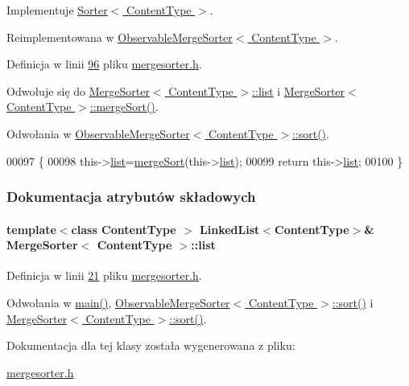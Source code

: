 Implementuje \hyperlink{class_sorter_a880cfd8969b78557ed207ad6f2bd4819}{Sorter$<$ Content\-Type $>$}.



Reimplementowana w \hyperlink{class_observable_merge_sorter_adc1960b58289c829ca9c77b7b6bc306f}{Observable\-Merge\-Sorter$<$ Content\-Type $>$}.



Definicja w linii \hyperlink{mergesorter_8h_source_l00096}{96} pliku \hyperlink{mergesorter_8h_source}{mergesorter.\-h}.



Odwołuje się do \hyperlink{mergesorter_8h_source_l00021}{Merge\-Sorter$<$ Content\-Type $>$\-::list} i \hyperlink{mergesorter_8h_source_l00074}{Merge\-Sorter$<$ Content\-Type $>$\-::merge\-Sort()}.



Odwołania w \hyperlink{observablemergesorter_8h_source_l00026}{Observable\-Merge\-Sorter$<$ Content\-Type $>$\-::sort()}.


\begin{DoxyCode}
00097         \{
00098                 this->\hyperlink{class_merge_sorter_a2fdeadd95d226a04243bab8b5104e324}{list}=\hyperlink{class_merge_sorter_a18cea501ccb017ea6a725698254ccd3f}{mergeSort}(this->\hyperlink{class_merge_sorter_a2fdeadd95d226a04243bab8b5104e324}{list});
00099                 \textcolor{keywordflow}{return} this->\hyperlink{class_merge_sorter_a2fdeadd95d226a04243bab8b5104e324}{list};
00100         \}
\end{DoxyCode}


\subsubsection{Dokumentacja atrybutów składowych}
\hypertarget{class_merge_sorter_a2fdeadd95d226a04243bab8b5104e324}{
\paragraph[{list}]{\setlength{\rightskip}{0pt plus 5cm}template$<$class Content\-Type $>$ {\bf Linked\-List}$<$Content\-Type$>$\& {\bf Merge\-Sorter}$<$ Content\-Type $>$\-::list}}\label{class_merge_sorter_a2fdeadd95d226a04243bab8b5104e324}


Definicja w linii \hyperlink{mergesorter_8h_source_l00021}{21} pliku \hyperlink{mergesorter_8h_source}{mergesorter.\-h}.



Odwołania w \hyperlink{main_8cpp_source_l00022}{main()}, \hyperlink{observablemergesorter_8h_source_l00026}{Observable\-Merge\-Sorter$<$ Content\-Type $>$\-::sort()} i \hyperlink{mergesorter_8h_source_l00096}{Merge\-Sorter$<$ Content\-Type $>$\-::sort()}.



Dokumentacja dla tej klasy została wygenerowana z pliku\-:\begin{DoxyCompactItemize}
\item 
\hyperlink{mergesorter_8h}{mergesorter.\-h}\end{DoxyCompactItemize}
